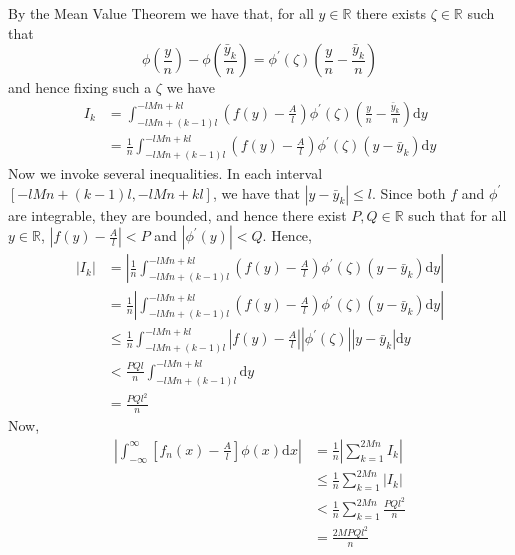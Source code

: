 \documentclass{article}
\begin{document}
%
By the Mean Value Theorem we have that, for all $y \in \mathbb{R}$ there
exists $\zeta \in \mathbb{R}$ such that
%
\begin{equation*}
    \phi\left(\frac{y}{n}\right) - \phi\left(\frac{\bar{y}_k}{n}\right)
        = \phi^\prime(\zeta) \left( \frac{y}{n} - \frac{\bar{y}_k}{n} \right)
\end{equation*}
%
and hence fixing such a $\zeta$ we have
%
\begin{align*}
    I_k &= \int_{-l M n + (k - 1) l}^{- l M n + k l}
            \left( f(y) - \frac{A}{l} \right) \phi^\prime(\zeta) \left( \frac{y}{n} - \frac{\bar{y}_k}{n} \right)
           \mathrm{d} y \\
        &= \frac{1}{n} \int_{-l M n + (k - 1) l}^{- l M n + k l}
            \left( f(y) - \frac{A}{l} \right) \phi^\prime(\zeta) \left( y - \bar{y}_k \right)
           \mathrm{d} y
\end{align*}
%
Now we invoke several inequalities. In each interval
$[- l M n + (k - 1) l, - l M n + k l]$, we have that $|y - \bar{y}_k| \leq l$.
Since both $f$ and $\phi^\prime$ are integrable, they are bounded, and
hence there exist $P, Q \in \mathbb{R}$ such that for all
$y \in \mathbb{R}$, $|f(y) - \frac{A}{l}| < P$ and $|\phi^\prime(y)| < Q$.
%
Hence,
%
\begin{align*}
    |I_k| &= \left|
                \frac{1}{n} \int_{-l M n + (k - 1) l}^{- l M n + k l}
                 \left( f(y) - \frac{A}{l} \right) \phi^\prime(\zeta) \left( y - \bar{y}_k \right)
                \mathrm{d} y
             \right| \\
          &= \frac{1}{n} \left|
                \int_{-l M n + (k - 1) l}^{- l M n + k l}
                 \left( f(y) - \frac{A}{l} \right) \phi^\prime(\zeta) \left( y - \bar{y}_k \right)
                \mathrm{d} y
             \right| \\
          &\leq \frac{1}{n}
                \int_{-l M n + (k - 1) l}^{- l M n + k l}
                 \left| f(y) - \frac{A}{l} \right|
                 \left| \phi^\prime(\zeta) \right|
                 \left| y - \bar{y}_k \right|
                \mathrm{d} y \\
          &< \frac{P Q l}{n}
                \int_{-l M n + (k - 1) l}^{- l M n + k l}
                \mathrm{d} y \\
          &= \frac{P Q l^2}{n}
\end{align*}
%
Now,
%
\begin{align*}
    \left| \int_{-\infty}^{\infty} \left[ f_n(x) - \frac{A}{l} \right] \phi(x) \mathrm{d} x \right|
        &= \frac{1}{n} \left| \sum_{k = 1}^{2 M n} I_k \right| \\
        &\leq \frac{1}{n} \sum_{k = 1}^{2 M n} |I_k| \\
        &< \frac{1}{n} \sum_{k = 1}^{2 M n} \frac{P Q l^2}{n} \\
        &= \frac{2 M P Q l^2}{n}
\end{align*}
\end{document}
